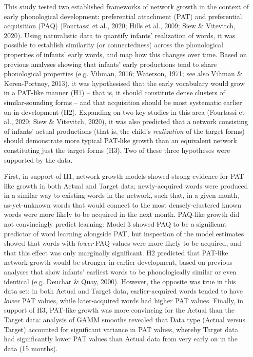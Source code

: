 \documentclass[
  man]{apa6}
\begin{document}
This study tested two established frameworks of network growth in the context of early phonological development: preferential attachment (PAT) and preferential acquisition (PAQ) (Fourtassi et al., 2020; Hills et al., 2009; Siew \& Vitevitch, 2020). Using naturalistic data to quantify infants' realization of words, it was possible to establish similarity (or connectedness) across the phonological properties of infants' early words, and map how this changes over time. Based on previous analyses showing that infants' early productions tend to share phonological properties (e.g. Vihman, 2016; Waterson, 1971; see also Vihman \& Keren-Portnoy, 2013), it was hypothesised that the early vocabulary would grow in a PAT-like manner (H1) -- that is, it should constitute dense clusters of similar-sounding forms -- and that acquisition should be most systematic earlier on in development (H2). Expanding on two key studies in this area (Fourtassi et al., 2020; Siew \& Vitevitch, 2020), it was also predicted that a network consisting of infants' actual productions (that is, the child's \emph{realization} of the target forms) should demonstrate more typical PAT-like growth than an equivalent network constituting just the target forms (H3). Two of these three hypotheses were supported by the data.

First, in support of H1, network growth models showed strong evidence for PAT-like growth in both Actual and Target data; newly-acquired words were produced in a similar way to existing words in the network, such that, in a given month, as-yet-unknown words that would connect to the most densely-clustered known words were more likely to be acquired in the next month. PAQ-like growth did not convincingly predict learning: Model 3 showed PAQ to be a significant predictor of word learning alongside PAT, but inspection of the model estimates showed that words with \emph{lower} PAQ values were more likely to be acquired, and that this effect was only marginally significant. H2 predicted that PAT-like network growth would be stronger in earlier development, based on previous analyses that show infants' earliest words to be phonologically similar or even identical (e.g. Deuchar \& Quay, 2000). However, the opposite was true in this data set: in both Actual and Target data, earlier-acquired words tended to have \emph{lower} PAT values, while later-acquired words had higher PAT values. Finally, in support of H3, PAT-like growth was more convincing for the Actual than the Target data: analysis of GAMM smooths revealed that Data type (Actual versus Target) accounted for significant variance in PAT values, whereby Target data had significantly lower PAT values than Actual data from very early on in the data (15 months).
\end{document}

